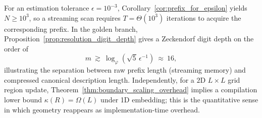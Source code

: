 \begin{remark}
For an estimation tolerance $\epsilon=10^{-3}$, Corollary~\ref{cor:prefix_for_epsilon} yields $N\ge 10^3$, so a streaming scan requires $T=\Theta(10^3)$ iterations to acquire the corresponding prefix.
In the golden branch, Proposition~\ref{prop:resolution_digit_depth} gives a Zeckendorf digit depth on the order of
\begin{equation}
m\ \gtrsim\ \log_{\varphi}\!\left(\sqrt{5}\,\epsilon^{-1}\right)\ \approx\ 16,
\end{equation}
illustrating the separation between raw prefix length (streaming memory) and compressed canonical description length.
Independently, for a $2$D $L\times L$ grid region update, Theorem~\ref{thm:boundary_scaling_overhead} implies a compilation lower bound $\kappa(R)=\Omega(L)$ under 1D embedding; this is the quantitative sense in which geometry reappears as implementation-time overhead.
\end{remark}
